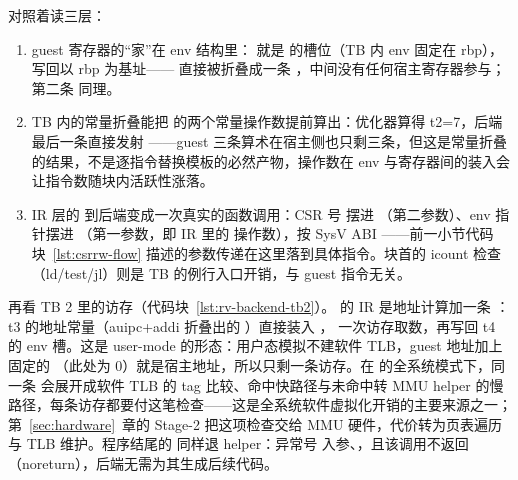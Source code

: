 对照着读三层：

\begin{enumerate}[label=\arabic*.,leftmargin=2.5em,itemsep=2pt]
\item guest 寄存器的“家”在 env 结构里： 就是  的槽位（TB 内 env 固定在 rbp），写回以 rbp 为基址—— 直接被折叠成一条 ，中间没有任何宿主寄存器参与；第二条  同理。
\item TB 内的常量折叠能把  的两个常量操作数提前算出：优化器算得 t2=7，后端最后一条直接发射 ——guest 三条算术在宿主侧也只剩三条，但这是常量折叠的结果，不是逐指令替换模板的必然产物，操作数在 env 与寄存器间的装入会让指令数随块内活跃性涨落。
\item IR 层的  到后端变成一次真实的函数调用：CSR 号  摆进 （第二参数）、env 指针摆进 （第一参数，即 IR 里的  操作数），按 SysV ABI ——前一小节代码块~\ref{lst:csrrw-flow} 描述的参数传递在这里落到具体指令。块首的 icount 检查（ld/test/jl）则是 TB 的例行入口开销，与 guest 指令无关。
\end{enumerate}

再看 TB 2 里的访存（代码块~\ref{lst:rv-backend-tb2}）。 的 IR 是地址计算加一条 ：t3 的地址常量（auipc+addi 折叠出的 ）直接装入 ， 一次访存取数，再写回 t4 的 env 槽。这是 user-mode 的形态：用户态模拟不建软件 TLB，guest 地址加上固定的 （此处为 0）就是宿主地址，所以只剩一条访存。在  的全系统模式下，同一条  会展开成软件 TLB 的 tag 比较、命中快路径与未命中转 MMU helper 的慢路径，每条访存都要付这笔检查——这是全系统软件虚拟化开销的主要来源之一；第~\ref{sec:hardware}~章的 Stage-2 把这项检查交给 MMU 硬件，代价转为页表遍历与 TLB 维护。程序结尾的  同样退 helper：异常号  入参、，且该调用不返回（noreturn），后端无需为其生成后续代码。


